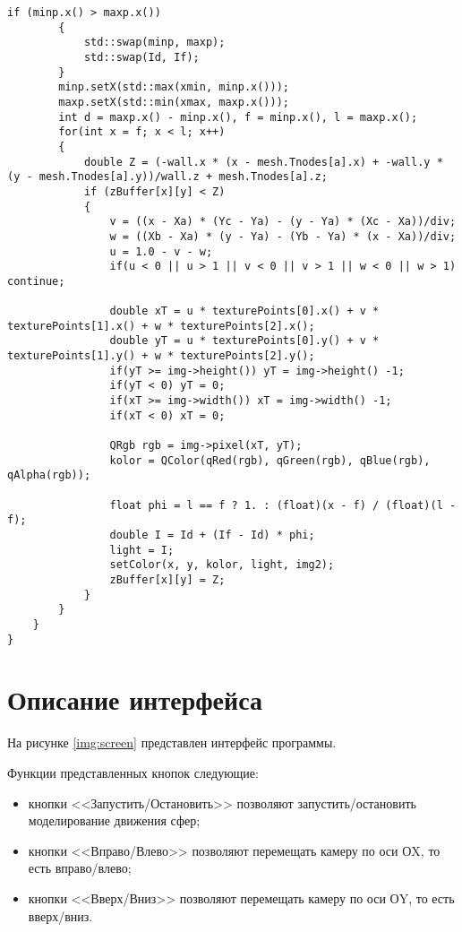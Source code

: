 \begin{center}
\begin{lstlisting}[label=lst:zbuff,caption=Алгоритм z-буфера с закраской по Гуро]
        if (minp.x() > maxp.x())
        {
            std::swap(minp, maxp);
            std::swap(Id, If);
        }
        minp.setX(std::max(xmin, minp.x()));
        maxp.setX(std::min(xmax, maxp.x()));
        int d = maxp.x() - minp.x(), f = minp.x(), l = maxp.x();
        for(int x = f; x < l; x++)
        {
            double Z = (-wall.x * (x - mesh.Tnodes[a].x) + -wall.y * (y - mesh.Tnodes[a].y))/wall.z + mesh.Tnodes[a].z;
            if (zBuffer[x][y] < Z)
            {
                v = ((x - Xa) * (Yc - Ya) - (y - Ya) * (Xc - Xa))/div;
                w = ((Xb - Xa) * (y - Ya) - (Yb - Ya) * (x - Xa))/div;
                u = 1.0 - v - w;
                if(u < 0 || u > 1 || v < 0 || v > 1 || w < 0 || w > 1) continue;

                double xT = u * texturePoints[0].x() + v * texturePoints[1].x() + w * texturePoints[2].x();
                double yT = u * texturePoints[0].y() + v * texturePoints[1].y() + w * texturePoints[2].y();
                if(yT >= img->height()) yT = img->height() -1;
                if(yT < 0) yT = 0;
                if(xT >= img->width()) xT = img->width() -1;
                if(xT < 0) xT = 0;

                QRgb rgb = img->pixel(xT, yT);
                kolor = QColor(qRed(rgb), qGreen(rgb), qBlue(rgb), qAlpha(rgb));

                float phi = l == f ? 1. : (float)(x - f) / (float)(l - f);
                double I = Id + (If - Id) * phi;
                light = I;
                setColor(x, y, kolor, light, img2);
                zBuffer[x][y] = Z;
            }
        }
    }
}
\end{lstlisting}
\end{center}


\section{Описание интерфейса}
На рисунке \ref{img:screen} представлен интерфейс программы.


Функции представленных кнопок следующие:

\begin{itemize}[label=---]
	\item кнопки <<Запустить/Остановить>> позволяют запустить/остановить моделирование движения сфер;
	\item кнопки <<Вправо/Влево>> позволяют перемещать камеру по оси ОX, то есть вправо/влево;
        \item кнопки <<Вверх/Вниз>> позволяют перемещать камеру по оси ОY, то есть вверх/вниз.
\end{itemize}

